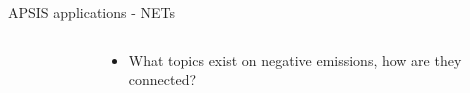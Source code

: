 \documentclass[9pt]{beamer}
\begin{document}
\begin{frame}{APSIS applications - NETs}

\nobibliography*

\begin{columns}
	\begin{column}{0.65\linewidth}
		\begin{figure}
			\caption{}
		\end{figure}
		
	\end{column}
	
	\begin{column}{0.35\linewidth}	
		\begin{itemize}
			\item<1->What topics exist on negative emissions, how are they connected? 
		\end{itemize}
		
	\end{column}
\end{columns}

\end{frame}
\end{document}
